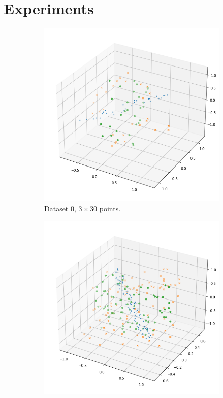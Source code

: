 \section{Experiments}\label{sec:experiments}

\begin{figure}
    \centering
    \begin{subfigure}{.3\textwidth}
        \centering
        \includegraphics[width=\textwidth]{pics/ds0.png}
        \caption{Dataset 0, $3\times 30$ points.}
    \end{subfigure}%
    \hspace{1em}
    \begin{subfigure}{.3\textwidth}
        \centering
        \includegraphics[width=\textwidth]{pics/ds1.png}

\end{subfigure}
\end{figure}
